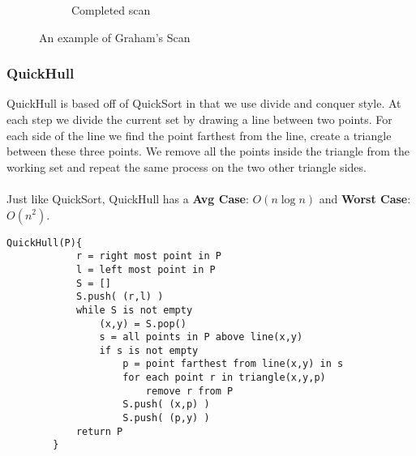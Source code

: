 \documentclass{article}
\begin{document}
\begin{figure}[h]
\begin{subfigure}{.4\textwidth}
				{\caption*{Completed scan}}
			\end{subfigure}
		{\caption*{An example of Graham's Scan}}
	\end{figure}


		\clearpage

		\subsubsection{QuickHull}
		QuickHull is based off of QuickSort in that we use divide and conquer style. At each step we divide the current set by drawing a line between two points. For each side of the line we find the point farthest from the line, create a triangle between these three points. We remove all the points inside the triangle from the working set and repeat the same process on the two other triangle sides.
		\\ \\
		Just like QuickSort, QuickHull has a {\bf Avg Case}: $O(n \log n)$ and {\bf Worst Case}: $O(n^2)$.

		\begin{lstlisting}[style=pseudo]
		QuickHull(P){
			r = right most point in P
			l = left most point in P
			S = []
			S.push( (r,l) )
			while S is not empty
				(x,y) = S.pop()
				s = all points in P above line(x,y)
				if s is not empty
					p = point farthest from line(x,y) in s
					for each point r in triangle(x,y,p)
						remove r from P
					S.push( (x,p) )
					S.push( (p,y) )
			return P
		}
		\end{lstlisting}
\end{document}
